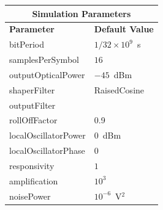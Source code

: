 \begin{refsection}
\begin{table}[H]
	\begin{tabular}{|l|l|}
		\hline
		\multicolumn{2}{|c|}{ \textbf{Simulation Parameters} } \\
		\hline
		\textbf{Parameter}     & \textbf{Default Value}                                     \\\hline
		bitPeriod              & $1/32\times10^9$~s														\\\hline
		samplesPerSymbol       & $16$                                                       \\\hline
		outputOpticalPower     & $-45$~dBm 													\\ \hline
		shaperFilter	       & RaisedCosine												\\ \hline
		outputFilter		   & 															\\ \hline
		rollOffFactor		   & 0.9														\\ \hline
		localOscillatorPower   & $0$~dBm                                                    \\ \hline
		localOscillatorPhase   & $0$                                                        \\ \hline
		responsivity           & $1$                                                        \\ \hline
		amplification          & $10^3$                                                     \\ \hline
		noisePower   & $10^{-6}$~V$^2$                             					\\ \hline

\end{tabular}
\end{table}
\end{refsection}
